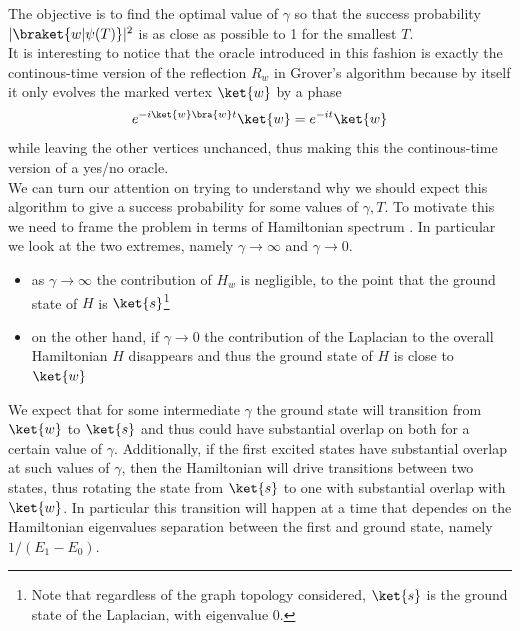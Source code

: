 \noindent
The objective is to find the optimal value of $\gamma$ so that the success probability $|\braket{w|\psi(T)}|^2$ is as close as possible to 1 for the smallest $T$. \\
It is interesting to notice that the oracle introduced in this fashion is exactly the continous-time version of the reflection $R_w$ in Grover's algorithm \cite{Wong2016} because by itself it only evolves the marked vertex $\ket{w}$ by a phase
\begin{equation}
  e^{-i\ket{w}\bra{w}t}\ket{w} = e^{-it}\ket{w}
\end{equation}
while leaving the other vertices unchanced, thus making this the continous-time version of a yes/no oracle. \\


\noindent
We can turn our attention on trying to understand why we should expect this algorithm to give a success probability for some values of $\gamma, T$. To motivate this we need to frame the problem in terms of Hamiltonian spectrum \cite{Childs2004}. In particular we look at the two extremes, namely $\gamma\rightarrow\infty$ and $\gamma\rightarrow 0$.
\begin{itemize}
  \item as $\gamma\rightarrow\infty$ the contribution of $H_w$ is negligible, to the point that the ground state of $H$ is $\ket{s}$\footnote{Note that regardless of the graph topology considered, $\ket{s}$ is the ground state of the Laplacian, with eigenvalue $0$.}
  \item on the other hand, if $\gamma\rightarrow 0$ the contribution of the Laplacian to the overall Hamiltonian $H$ disappears and thus the ground state of $H$ is close to $\ket{w}$
\end{itemize}
We expect that for some intermediate $\gamma$ the ground state will transition from $\ket{w}$ to $\ket{s}$ and thus could have substantial overlap on both for a certain value of $\gamma$. Additionally, if the first excited states have substantial overlap at such values of $\gamma$, then the Hamiltonian will drive transitions between two states, thus rotating the state from $\ket{s}$ to one with substantial overlap with $\ket{w}$. In particular this transition will happen at a time that dependes on the Hamiltonian eigenvalues separation between the first and ground state, namely $1/(E_1-E_0)$.


